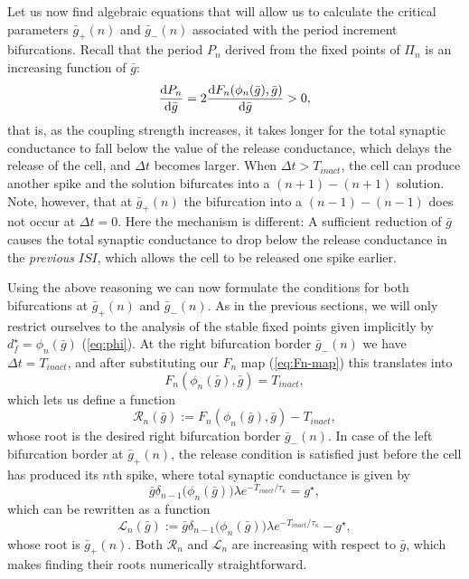 Let us now find algebraic equations that will allow us to calculate the critical parameters $\bar g_+(n)$ and $\bar g_-(n)$ associated with the period increment bifurcations.
Recall that the period $P_n$ derived from the fixed points of $\Pi_n$ is an increasing function of $\bar g$:
\begin{equation}
	\dv{P_{n}}{\bar g}=2\dv{F_n(\phi_n(\bar g), \bar g)}{\bar g}>0,
\end{equation}
that is, as the coupling strength increases, it takes longer for the total synaptic conductance to fall below the value of the release conductance, which delays the release of the \suppressed{} cell, and $\Delta t$ becomes larger.
When $\Delta t > T_{inact}$, the \free{} cell can produce another spike and the solution bifurcates into a $(n+1)-(n+1)$ solution.
Note, however, that at $\bar g_+(n)$ the bifurcation into a $(n-1)-(n-1)$ does not occur at $\Delta t = 0$.
Here the mechanism is different: A sufficient reduction of $\bar g$ causes the total synaptic conductance to drop below the release conductance in the \emph{previous} $ISI$, which allows the \suppressed{} cell to be released one spike earlier.

Using the above reasoning we can now formulate the conditions for both bifurcations at $\bar g_+(n)$ and $\bar g_-(n)$.
As in the previous sections, we will only restrict ourselves to the analysis of the stable fixed points given implicitly by $d^\star_f=\phi_n(\bar g)$ (\cref{eq:phi}).
At the right bifurcation border $\bar g_-(n)$ we have $\Delta t=T_{inact}$, and after substituting our $F_n$ map (\cref{eq:Fn-map}) this translates into
\begin{equation}
	F_n(\phi_n(\bar g), \bar g) = T_{inact},
\end{equation}
which lets us define a function
\begin{equation}
	\label{eq:R}
	\mathcal{R}_{n}(\bar g):=F_n(\phi_n(\bar g), \bar g)-T_{inact},
\end{equation}
whose root is the desired right bifurcation border $\bar g_-(n)$.
In case of the left bifurcation border at $\bar g_+(n)$, the release condition is satisfied just before the \free{} cell has produced its $n$th spike, where total synaptic conductance is given by
\begin{equation}
	\bar g \delta_{n-1}\big(\phi_n(\bar g)\big)\lambda e^{-T_{inact}/\tau_\kappa} = g^\star,
\end{equation}
which can be rewritten as a function
\begin{equation}
	\label{eq:L}
	\mathcal{L}_n(\bar g):=\bar g \delta_{n-1}\big(\phi_n(\bar g)\big)\lambda e^{-T_{inact}/\tau_\kappa} -g^\star,
\end{equation}
whose root is $\bar g_+(n)$.
Both $\mathcal{R}_n$ and $\mathcal{L}_n$ are increasing with respect to $\bar g$, which makes finding their roots numerically straightforward.

